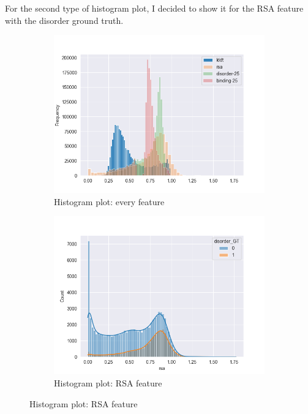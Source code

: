 For the second type of histogram plot, I decided to show it for the RSA feature with the disorder ground truth.

\begin{figure}[h!]
\centering
    \begin{subfigure}{0.8\linewidth}
        \includegraphics[width=\linewidth]{res/analysis/plots/dis1-histplot_all.png}
        \caption{Histogram plot: every feature}
    \end{subfigure}
    \vfill
    \begin{subfigure}{0.8\linewidth}
        \includegraphics[width=\linewidth]{res/analysis/plots/hue-histplot_rsa.png}
        \caption{Histogram plot: RSA feature}
    \end{subfigure}

\end{figure}

